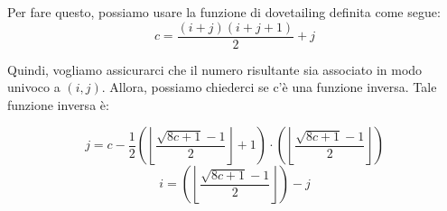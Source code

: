 \documentclass[]{scrartcl}
\begin{document}
\begin{itemize}
Per fare questo, possiamo usare la funzione di dovetailing definita come segue:
\[c = \frac{(i+j)(i+j+1)}{2} + j\]

Quindi, vogliamo assicurarci che il numero risultante sia associato in modo univoco a $ (i, j) $. Allora, possiamo chiederci se c'è una funzione inversa. Tale funzione inversa è:

\[j = c - \frac{1}{2}\left(\left\lfloor\frac{\sqrt{8c+1}-1}{2}\right\rfloor + 1\right) \cdot\left(\left\lfloor\frac{\sqrt{8c+1}-1}{2}\right\rfloor\right)\]
\[i = \left(\left\lfloor\frac{\sqrt{8c+1}-1}{2}\right\rfloor\right)-j\]
\end{itemize}
\end{document}
